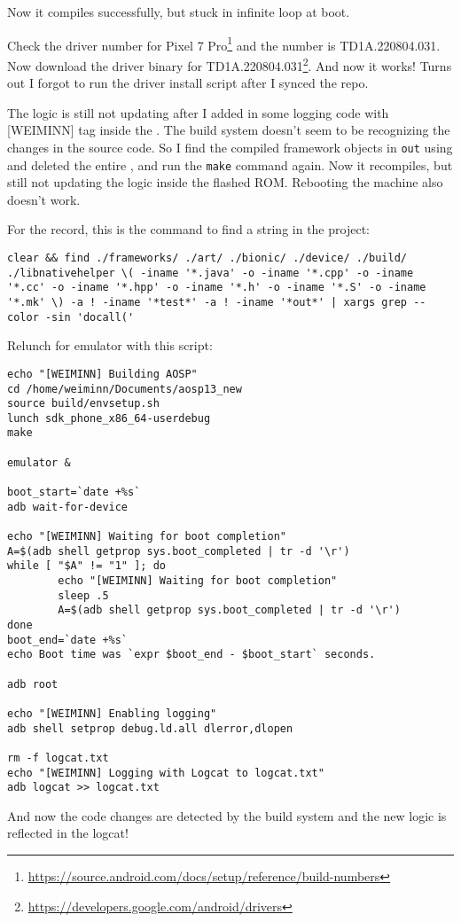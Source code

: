 Now it compiles successfully, but stuck in infinite loop at boot.

Check the driver number for Pixel 7 Pro\footnote{\url{https://source.android.com/docs/setup/reference/build-numbers}} and the number is TD1A.220804.031. Now download the driver binary for TD1A.220804.031\footnote{\url{https://developers.google.com/android/drivers}}. And now it works! Turns out I forgot to run the driver install script after I synced the repo.

The logic is still not updating after I added in some logging code with [WEIMINN] tag inside the . The build system doesn't seem to be recognizing the changes in the source code. So I find the compiled framework objects in \texttt{out} using  and deleted the entire , and run the \texttt{make} command again. Now it recompiles, but still not updating the logic inside the flashed ROM. Rebooting the machine also doesn't work.

For the record, this is the command to find a string in the project:
\begin{lstlisting}
clear && find ./frameworks/ ./art/ ./bionic/ ./device/ ./build/ ./libnativehelper \( -iname '*.java' -o -iname '*.cpp' -o -iname '*.cc' -o -iname '*.hpp' -o -iname '*.h' -o -iname '*.S' -o -iname '*.mk' \) -a ! -iname '*test*' -a ! -iname '*out*' | xargs grep --color -sin 'docall('
\end{lstlisting}

Relunch for emulator with this script:
\begin{lstlisting}
echo "[WEIMINN] Building AOSP"
cd /home/weiminn/Documents/aosp13_new
source build/envsetup.sh
lunch sdk_phone_x86_64-userdebug
make

emulator &

boot_start=`date +%s`
adb wait-for-device

echo "[WEIMINN] Waiting for boot completion"
A=$(adb shell getprop sys.boot_completed | tr -d '\r')
while [ "$A" != "1" ]; do
        echo "[WEIMINN] Waiting for boot completion"
        sleep .5
        A=$(adb shell getprop sys.boot_completed | tr -d '\r')
done
boot_end=`date +%s`
echo Boot time was `expr $boot_end - $boot_start` seconds.

adb root

echo "[WEIMINN] Enabling logging"
adb shell setprop debug.ld.all dlerror,dlopen

rm -f logcat.txt 
echo "[WEIMINN] Logging with Logcat to logcat.txt"
adb logcat >> logcat.txt    
\end{lstlisting}
And now the code changes are detected by the build system and the new logic is reflected in the logcat!

